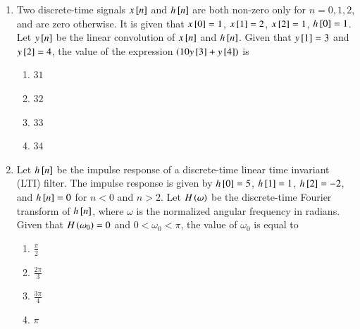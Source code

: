 \documentclass[journal,12pt,onecolumn]{IEEEtran}
\theoremstyle{remark}
\begin{document}
\begin{enumerate}
\item Two discrete-time signals $x{}\left[n\right]$ and $h{}\left[n\right]$ are both non-zero only for $n = 0, 1, 2$, and are zero otherwise. It is given that $x{}\left[0\right] = 1$, $x{}\left[1\right] = 2$, $x{}\left[2\right] = 1$, $h{}\left[0\right] = 1$. Let $y{}\left[n\right]$ be the linear convolution of $x{}\left[n\right]$ and $h{}\left[n\right]$. Given that $y{}\left[1\right] = 3$ and $y{}\left[2\right] = 4$, the value of the expression $(10y{}\left[3\right] + y{}\left[4\right])$ is
\begin{multicols}{4}
\begin{enumerate}
\item $31$
\item $32$
\item $33$
\item $34$
\end{enumerate}
\end{multicols}
\hfill {}

\item Let $h{}\left[n\right]$ be the impulse response of a discrete-time linear time invariant (LTI) filter. The impulse response is given by $h{}\left[0\right] = 5$, $h{}\left[1\right] = 1$, $h{}\left[2\right] = -2$, and $h{}\left[n\right] = 0$ for $n < 0$ and $n > 2$. Let $H\left(\omega\right)$ be the discrete-time Fourier transform  of $h{}\left[n\right]$, where $\omega$ is the normalized angular frequency in radians. Given that $H\left(\omega_0\right) = 0$ and $0 < \omega_0 < \pi$, the value of $\omega_0$  is equal to
\begin{multicols}{4}
\begin{enumerate}
\item $\frac{\pi}{2}$
\item $\frac{2\pi}{3}$
\item $\frac{3\pi}{4}$
\item $\pi$
\end{enumerate}
\end{multicols}
\hfill {}


\end{enumerate}
\end{document}
